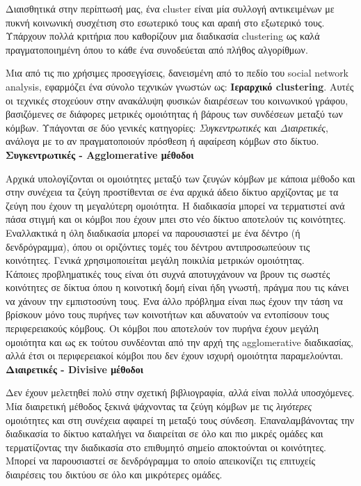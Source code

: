 Διαισθητικά στην περίπτωσή μας, ένα cluster είναι μία συλλογή αντικειμένων με πυκνή κοινωνική συσχέτιση στο 
εσωτερικό τους και αραιή στο εξωτερικό τους.  
Υπάρχουν πολλά κριτήρια που καθορίζουν μια διαδικασία clustering ως καλά πραγματοποιημένη
όπου το κάθε ένα συνοδεύεται από πλήθος αλγορίθμων.
\cite{ClusteringSocialNetworks}

Μια από τις πιο χρήσιμες προσεγγίσεις, δανεισμένη από το πεδίο του social network analysis,
εφαρμόζει ένα σύνολο τεχνικών γνωστών ως: \textbf{Ιεραρχικό clustering}. 
Αυτές οι τεχνικές στοχεύουν στην ανακάλυψη φυσικών διαιρέσεων του κοινωνικού γράφου, βασιζόμενες σε διάφορες μετρικές ομοιότητας ή βάρους των συνδέσεων μεταξύ των κόμβων. 
Υπάγονται σε δύο γενικές κατηγορίες: \emph{Συγκεντρωτικές} και \emph{Διαιρετικές}, ανάλογα με το αν πραγματοποιούν πρόσθεση ή αφαίρεση κόμβων στο δίκτυο.\\

\noindent
\textbf{Συγκεντρωτικές - Agglomerative μέθοδοι}

Αρχικά υπολογίζονται οι ομοιότητες μεταξύ των ζευγών κόμβων με κάποια μέθοδο και στην συνέχεια τα ζεύγη προστίθενται σε ένα αρχικά άδειο δίκτυο
αρχίζοντας με τα ζεύγη που έχουν τη μεγαλύτερη ομοιότητα.
Η διαδικασία μπορεί να τερματιστεί ανά πάσα στιγμή και οι κόμβοι που έχουν μπει στο νέο δίκτυο αποτελούν τις κοινότητες.
Εναλλακτικά η όλη διαδικασία μπορεί να παρουσιαστεί με ένα δέντρο (ή δενδρόγραμμα), όπου οι οριζόντιες τομές του δέντρου αντιπροσωπεύουν τις κοινότητες.
Γενικά χρησιμοποιείται μεγάλη ποικιλία μετρικών ομοιότητας.\\
Κάποιες προβληματικές τους είναι ότι συχνά αποτυγχάνουν να βρουν τις σωστές κοινότητες σε δίκτυα
όπου η κοινοτική δομή είναι ήδη γνωστή, πράγμα που τις κάνει να χάνουν την εμπιστοσύνη τους. Ένα άλλο πρόβλημα είναι πως έχουν την τάση να βρίσκουν
μόνο τους πυρήνες των κοινοτήτων και αδυνατούν να εντοπίσουν τους περιφερειακούς κόμβους. 
Οι κόμβοι που αποτελούν τον πυρήνα έχουν μεγάλη ομοιότητα και ως εκ τούτου
συνδέονται από την αρχή της agglomerative διαδικασίας, αλλά έτσι οι περιφερειακοί κόμβοι που δεν έχουν ισχυρή ομοιότητα παραμελούνται.\\

\noindent
\textbf{Διαιρετικές - Divisive μέθοδοι}

Δεν έχουν μελετηθεί πολύ στην σχετική βιβλιογραφία, αλλά είναι πολλά υποσχόμενες. 
Μία διαιρετική μέθοδος ξεκινά ψάχνοντας τα ζεύγη κόμβων με τις \emph{λιγότερες} ομοιότητες και στη συνέχεια αφαιρεί τη μεταξύ τους σύνδεση.
Επαναλαμβάνοντας την διαδικασία το δίκτυο καταλήγει να διαιρείται σε όλο και πιο μικρές ομάδες και τερματίζοντας την διαδικασία στο επιθυμητό 
σημείο αποκτούνται οι κοινότητες. Μπορεί να παρουσιαστεί σε δενδρόγραμμα το οποίο απεικονίζει
τις επιτυχείς διαιρέσεις του δικτύου σε όλο και μικρότερες ομάδες.
\cite{PhysRevE.69.026113}


